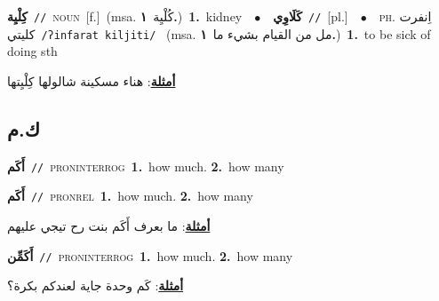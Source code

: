 \documentclass[10pt,a4paper,twoside]{article} %
\begin{document}
\begin{multicols}{2}
{\setlength\topsep{0pt}\textbf{\foreignlanguage{arabic}{كِلْيِة}}\ {\color{gray}\texttt{//}\color{black}}\ \textsc{noun}\ [f.]\ \color{gray}(msa. \foreignlanguage{arabic}{كُلْيِة}~\foreignlanguage{arabic}{\textbf{١.}})\color{black}\ \textbf{1.}~kidney\ \ $\bullet$\ \ \setlength\topsep{0pt}\textbf{\foreignlanguage{arabic}{كَلَاوِي}}\ {\color{gray}\texttt{//}\color{black}}\ [pl.]\ \ $\bullet$\ \ \textsc{ph.} \color{gray} \foreignlanguage{arabic}{اِنفرت كليتي}\color{black}\ {\color{gray}\texttt{/{\sffamily ʔinfarat kiljiti}/}\color{black}}\ \color{gray} (msa. \foreignlanguage{arabic}{مل من القيام بشيء ما}~\foreignlanguage{arabic}{\textbf{١.}})\color{black}\ \textbf{1.}~to be sick of doing sth\  \begin{flushright}\color{gray}\foreignlanguage{arabic}{\textbf{\underline{\foreignlanguage{arabic}{أمثلة}}}: هناء مسكينة شالولها كِلْيِتها}\end{flushright}\color{black}} \vspace{2mm}

\vspace{-3mm}
\subsection*{\color{blue}\foreignlanguage{arabic}{ك.م}\color{blue}{ (ntws)}} 

{\setlength\topsep{0pt}\textbf{\foreignlanguage{arabic}{أَكَم}}\ {\color{gray}\texttt{//}\color{black}}\ \textsc{pron\textunderscore interrog}\ \textbf{1.}~how much.  \textbf{2.}~how many\ } \vspace{2mm}

{\setlength\topsep{0pt}\textbf{\foreignlanguage{arabic}{أَكَم}}\ {\color{gray}\texttt{//}\color{black}}\ \textsc{pron\textunderscore rel}\ \textbf{1.}~how much.  \textbf{2.}~how many\  \begin{flushright}\color{gray}\foreignlanguage{arabic}{\textbf{\underline{\foreignlanguage{arabic}{أمثلة}}}: ما بعرف أَكَم بنت رح تيجي عليهم}\end{flushright}\color{black}} \vspace{2mm}

{\setlength\topsep{0pt}\textbf{\foreignlanguage{arabic}{أَكَمِّن}}\ {\color{gray}\texttt{//}\color{black}}\ \textsc{pron\textunderscore interrog}\ \textbf{1.}~how much.  \textbf{2.}~how many\  \begin{flushright}\color{gray}\foreignlanguage{arabic}{\textbf{\underline{\foreignlanguage{arabic}{أمثلة}}}: كَم وحدة جاية لعندكم بكرة؟}\end{flushright}\color{black}} \vspace{2mm}


\end{multicols}
\end{document}
